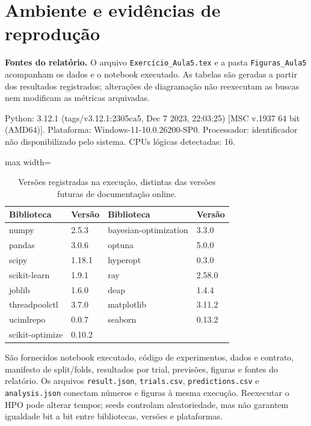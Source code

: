 \documentclass[12pt,a4paper]{article}
\begin{document}
\section{Ambiente e evidências de reprodução}

\textbf{Fontes do relatório.} O arquivo \texttt{Exercício\_Aula5.tex} e a pasta \texttt{Figuras\_Aula5} acompanham os dados e o notebook executado. As tabelas são geradas a partir dos resultados registrados; alterações de diagramação não reexecutam as buscas nem modificam as métricas arquivadas.

Python: 3.12.1 (tags/v3.12.1:2305ca5, Dec  7 2023, 22:03:25) [MSC v.1937 64 bit (AMD64)]. Plataforma: Windows-11-10.0.26200-SP0. Processador: identificador não disponibilizado pelo sistema. CPUs lógicas detectadas: 16.

\begin{table}[H]
\centering
\caption{Versões registradas na execução, distintas das versões futuras de documentação online.}
\small
\setlength{\tabcolsep}{4.5pt}
\renewcommand{\arraystretch}{1.16}
\begin{adjustbox}{max width=\linewidth}
\begin{tabular}{@{}ll@{\hspace{1cm}}ll@{}}
\toprule
Biblioteca & Versão & Biblioteca & Versão \\
\midrule
numpy & 2.5.3 & bayesian-optimization & 3.3.0 \\
pandas & 3.0.6 & optuna & 5.0.0 \\
scipy & 1.18.1 & hyperopt & 0.3.0 \\
scikit-learn & 1.9.1 & ray & 2.58.0 \\
joblib & 1.6.0 & deap & 1.4.4 \\
threadpoolctl & 3.7.0 & matplotlib & 3.11.2 \\
ucimlrepo & 0.0.7 & seaborn & 0.13.2 \\
scikit-optimize & 0.10.2 &  &  \\
\bottomrule
\end{tabular}
\end{adjustbox}
\end{table}

São fornecidos notebook executado, código de experimentos, dados e contrato, manifesto de split/folds, resultados por trial, previsões, figuras e fontes do relatório. Os arquivos \texttt{result.json}, \texttt{trials.csv}, \texttt{predictions.csv} e \texttt{analysis.json} conectam números e figuras à mesma execução. Reexecutar o HPO pode alterar tempos; seeds controlam aleatoriedade, mas não garantem igualdade bit a bit entre bibliotecas, versões e plataformas.
\end{document}
